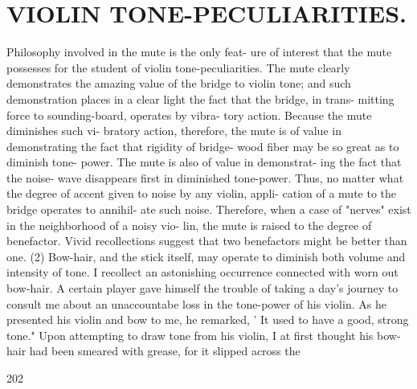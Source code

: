 \documentclass{article}
\begin{document}
\section*{VIOLIN TONE-PECULIARITIES.}
Philosophy involved in the mute is the only feat- ure of interest that the mute possesses for the student of violin tone-peculiarities. The mute clearly demonstrates the amazing value of the bridge to violin tone; and such demonstration places in a clear light the fact that the bridge, in trans- mitting force to sounding-board, operates by vibra- tory action. Because the mute diminishes such vi- bratory action, therefore, the mute is of value in demonstrating the fact that rigidity of bridge- wood fiber may be so great as to diminish tone- power. The mute is also of value in demonstrat- ing the fact that the noise- wave disappears first in diminished tone-power. Thus, no matter what the degree of accent given to noise by any violin, appli- cation of a mute to the bridge operates to annihil- ate such noise. Therefore, when a case of "nerves" exist in the neighborhood of a noisy vio- lin, the mute is raised to the degree of benefactor. Vivid recollections suggest that two benefactors might be better than one. (2) Bow-hair, and the stick itself, may operate to diminish both volume and intensity of tone. I recollect an astonishing occurrence connected with worn out bow-hair. A certain player gave himself the trouble of taking a day's journey to consult me about an unaccountabe loss in the tone-power of his violin. As he presented his violin and bow to me, he remarked, ' It used to have a good, strong tone." Upon attempting to draw tone from his violin, I at first thought his bow-hair had been smeared with grease, for it slipped across the

202
\end{document}
